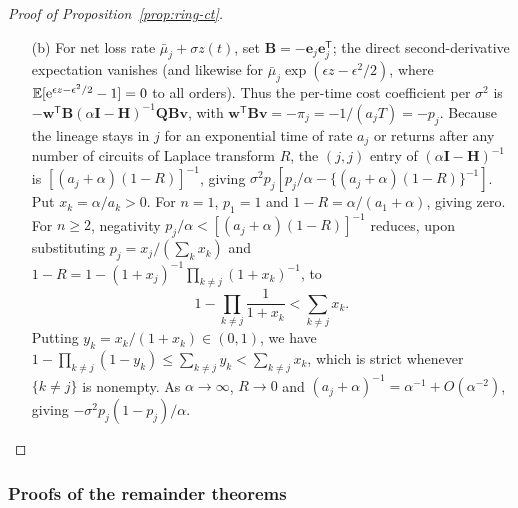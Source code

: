 \begin{proof}[Proof of Proposition~{\upshape\ref{prop:ring-ct}}]
\begin{enumerate}
For $n = 1$, $\dd x_1/\dd t = [b_1\nu_1 h_1(t) - (\nu_1 + \mu_1)]x_1$, so $t^{-1}\ln x_1(t) \to b_1\nu_1\E h_1 - (\nu_1 + \mu_1) = r_0$ at every $\sigma$ because $\E h_1 = 1$ (and $R/(1 - R) = a_1/\alpha = 1/(\alpha T)$). For $n \ge 2$, $\prod_{j=1}^n (1 + \alpha/a_j) - 1 > \alpha\sum_{j=1}^n 1/a_j = \alpha T$, so $0 < R/(1 - R) < 1/(\alpha T)$ and the cost coefficient lies strictly in $(0, (\alpha T^2)^{-1})$. At equal $a_j = q$ across $n$ hosts, $T = n/q$ and $R = (1 + \alpha/q)^{-n}$, giving $\sigma^2[q/\alpha - n/\{(1 + \alpha/q)^n - 1\}]$, which strictly increases in $n$ as in Proposition~\ref{prop:ring-series}(ii); expanding in $\alpha \to 0$ gives $\sigma^2(1 - \mathrm{CV}^2)/2 = \sigma^2(1 - 1/n)/2$ per host, so $\sigma^2(n - 1)/2$ in total, while $\alpha \to \infty$ gives $\sigma^2 q/\alpha$ for $n \ge 2$.
\item[(b)] For net loss rate $\bar{\mu}_j + \sigma z(t)$, set $\mathbf{B} = -\mathbf{e}_j\mathbf{e}_j^{\mathsf{T}}$; the direct second-derivative expectation vanishes (and likewise for $\bar{\mu}_j\exp(\epsilon z - \epsilon^2/2)$, where $\mathbb{E}[\mathrm{e}^{\epsilon z - \epsilon^2/2} - 1] = 0$ to all orders). Thus the per-time cost coefficient per $\sigma^2$ is $-\mathbf{w}^{\mathsf{T}}\mathbf{B}(\alpha\mathbf{I} - \mathbf{H})^{-1}\mathbf{Q}\mathbf{B}\mathbf{v}$, with $\mathbf{w}^{\mathsf{T}}\mathbf{B}\mathbf{v} = -\pi_j = -1/(a_j T) = -p_j$. Because the lineage stays in $j$ for an exponential time of rate $a_j$ or returns after any number of circuits of Laplace transform $R$, the $(j,j)$ entry of $(\alpha\mathbf{I} - \mathbf{H})^{-1}$ is $[(a_j + \alpha)(1 - R)]^{-1}$, giving $\sigma^2 p_j [p_j/\alpha - \{(a_j + \alpha)(1 - R)\}^{-1}]$. Put $x_k = \alpha/a_k > 0$. For $n = 1$, $p_1 = 1$ and $1 - R = \alpha/(a_1 + \alpha)$, giving zero. For $n \ge 2$, negativity $p_j/\alpha < [(a_j + \alpha)(1 - R)]^{-1}$ reduces, upon substituting $p_j = x_j/(\sum_k x_k)$ and $1 - R = 1 - (1 + x_j)^{-1}\prod_{k \ne j}(1 + x_k)^{-1}$, to
\[
1 - \prod_{k \ne j} \frac{1}{1 + x_k} < \sum_{k \ne j} x_k.
\]
Putting $y_k = x_k/(1 + x_k) \in (0, 1)$, we have $1 - \prod_{k \ne j}(1 - y_k) \le \sum_{k \ne j} y_k < \sum_{k \ne j} x_k$, which is strict whenever $\{k \ne j\}$ is nonempty. As $\alpha \to \infty$, $R \to 0$ and $(a_j + \alpha)^{-1} = \alpha^{-1} + O(\alpha^{-2})$, giving $-\sigma^2 p_j(1 - p_j)/\alpha$. \qedhere
\end{enumerate}
\end{proof}

\subsubsection{Proofs of the remainder theorems}\label{subsec:app-ring-rem}


